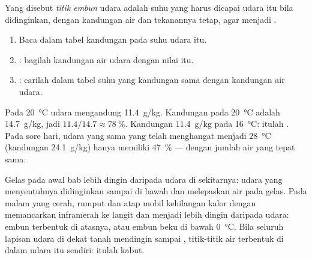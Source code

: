 \begin{definition}\label{def:g10:why-clouds-form:dew-point}
Yang disebut \emph{titik embun} udara adalah suhu yang
harus dicapai udara itu bila didinginkan, dengan kandungan air dan tekanannya
tetap, agar menjadi .
\end{definition}

\begin{method}\label{met:g10:why-clouds-form:table}
\begin{enumerate}
  \item Baca dalam tabel kandungan  pada suhu udara itu.
  \item {}: bagilah kandungan air udara dengan nilai itu.
  \item {}: carilah dalam tabel suhu yang kandungan  sama
        dengan kandungan air udara.
\end{enumerate}
\end{method}

\begin{example}\label{ex:g10:why-clouds-form:morning}
Pada \qty{20}{\degreeCelsius} udara mengandung \qty{11.4}{g/kg}. Kandungan
 pada \qty{20}{\degreeCelsius} adalah \qty{14.7}{g/kg}, jadi  $11.4/14.7 \approx \qty{78}{\percent}$. Kandungan 
\qty{11.4}{g/kg} pada \qty{16}{\degreeCelsius}: itulah . Pada
sore hari, udara yang sama yang telah menghangat menjadi
\qty{28}{\degreeCelsius} (kandungan  \qty{24.1}{g/kg}) hanya memiliki
 \qty{47}{\percent} --- dengan jumlah air yang tepat sama.
\end{example}

Gelas pada awal bab lebih dingin daripada  udara di sekitarnya:
udara yang menyentuhnya didinginkan sampai di bawah  dan
melepaskan air pada gelas. Pada malam yang cerah, rumput dan atap mobil
kehilangan kalor dengan memancarkan inframerah ke langit dan menjadi lebih
dingin daripada udara: embun terbentuk di atasnya, atau embun beku di bawah
\qty{0}{\degreeCelsius}. Bila seluruh lapisan udara di dekat tanah mendingin
sampai , titik-titik air terbentuk di dalam udara itu sendiri:
itulah kabut.

